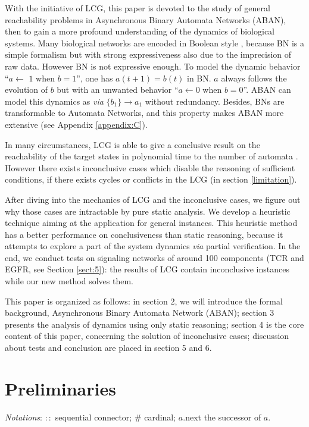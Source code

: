 \documentclass[runningheads]{llncs}
\newcommand{\ac}[3]{$\{#1\}\rightarrow#3$}
\begin{document}
With the initiative of LCG, this paper is devoted to the study of general reachability problems in Asynchronous Binary Automata Networks (ABAN), then to gain a more profound understanding of the dynamics of biological systems. 
Many biological networks are encoded in Boolean style \cite{kauffman1969}, because BN is a simple formalism but with strong expressiveness also due to the imprecision of raw data.
However BN is not expressive enough.
To model the dynamic behavior ``$a\gets$ $1$ when $b=1$'', one has $a(t+1)=b(t)$ in BN.
$a$ always follows the evolution of $b$ but with an unwanted behavior ``$a\gets 0$ when $b=0$''.
ABAN can model this dynamics as \textit{via} \ac{b_1}{a_0}{a_1} without redundancy. 
Besides, BNs are transformable to Automata Networks, and this property makes ABAN more extensive (see Appendix \ref{appendix:C}).

In many circumstances, LCG is able to give a conclusive result on the reachability of the target states in polynomial time to the number of automata \cite{pauleve2016goal}. 
However there exists inconclusive cases which disable the reasoning of sufficient conditions, if there exists cycles or conflicts in the LCG (in section \ref{limitation}).

After diving into the mechanics of LCG and the inconclusive cases, we figure out why those cases are intractable by pure static analysis. 
We develop a heuristic technique aiming at the application for general instances. 
This heuristic method has a better performance on conclusiveness than static reasoning, because it attempts to explore a part of the system dynamics \textit{via} partial verification.
In the end, we conduct tests on signaling networks of around 100 components (TCR and EGFR, see Section \ref{sect:5}): the results of LCG contain inconclusive instances \cite{folschette2015} while our new method solves them.

This paper is organized as follows: in section 2, we will introduce the formal background, Asynchronous Binary Automata Network (ABAN); section 3 presents the analysis of dynamics using only static reasoning; 
section 4 is the core content of this paper, concerning the solution of inconclusive cases; discussion about tests and conclusion are placed in section 5 and 6.

\section{Preliminaries}\label{sect:2}
\textit{Notations}:
$::$ sequential connector;
$\#$ cardinal;
$a.$next the successor of $a$. 
\end{document}
